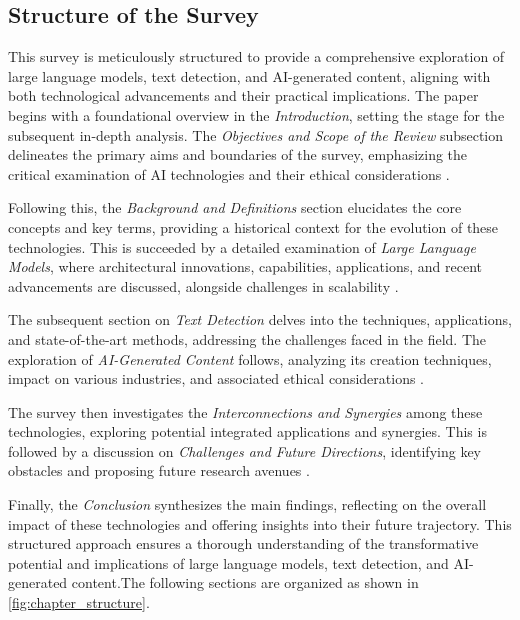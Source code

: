 \subsection{Structure of the Survey} \label{subsec:Structure of the Survey}



This survey is meticulously structured to provide a comprehensive exploration of large language models, text detection, and AI-generated content, aligning with both technological advancements and their practical implications. The paper begins with a foundational overview in the \textit{Introduction}, setting the stage for the subsequent in-depth analysis. The \textit{Objectives and Scope of the Review} subsection delineates the primary aims and boundaries of the survey, emphasizing the critical examination of AI technologies and their ethical considerations \cite{yamshchikov2020styletransferparaphraselookingsensible}. 



Following this, the \textit{Background and Definitions} section elucidates the core concepts and key terms, providing a historical context for the evolution of these technologies. This is succeeded by a detailed examination of \textit{Large Language Models}, where architectural innovations, capabilities, applications, and recent advancements are discussed, alongside challenges in scalability \cite{kasneci2023chatgpt}.



The subsequent section on \textit{Text Detection} delves into the techniques, applications, and state-of-the-art methods, addressing the challenges faced in the field. The exploration of \textit{AI-Generated Content} follows, analyzing its creation techniques, impact on various industries, and associated ethical considerations \cite{ni2018perceiveusersdepthlearning}.



The survey then investigates the \textit{Interconnections and Synergies} among these technologies, exploring potential integrated applications and synergies. This is followed by a discussion on \textit{Challenges and Future Directions}, identifying key obstacles and proposing future research avenues \cite{bassner2024irisaidrivenvirtualtutor}.



Finally, the \textit{Conclusion} synthesizes the main findings, reflecting on the overall impact of these technologies and offering insights into their future trajectory. This structured approach ensures a thorough understanding of the transformative potential and implications of large language models, text detection, and AI-generated content.The following sections are organized as shown in \autoref{fig:chapter_structure}.





